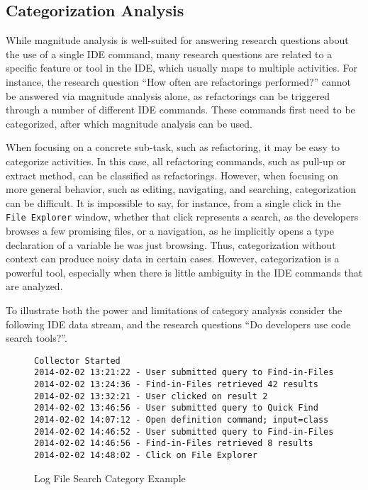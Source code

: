 \subsection{Categorization Analysis}

While magnitude analysis is well-suited for answering research questions about the use of a single IDE command, many research questions are related to a specific feature or tool in the IDE, which usually maps to multiple activities. For instance, the research question ``How often are refactorings performed?'' cannot be answered via magnitude analysis alone, as refactorings can be triggered through a number of different IDE commands. These commands first need to be categorized, after which magnitude analysis can be used. 

When focusing on a concrete sub-task, such as refactoring, it may be easy to categorize activities. In this case, all refactoring commands, such as pull-up or extract method, can be classified as refactorings. However, when focusing on more general behavior, such as editing, navigating, and searching, categorization can be difficult. It is impossible to say, for instance, from a single click in the {\tt File Explorer} window, whether that click represents a search, as the developers browses a few promising files, or a navigation, as he implicitly opens a type declaration of a variable he was just browsing. Thus, categorization without context can produce noisy data in certain cases. However, categorization is a powerful tool, especially when there is little ambiguity in the IDE commands that are analyzed.

To illustrate both the power and limitations of category analysis consider the following IDE data stream, and the research questions ``Do developers use code search tools?''. 
\begin{figure}
\hrulefill
\begin{verbatim}
Collector Started
2014-02-02 13:21:22 - User submitted query to Find-in-Files
2014-02-02 13:24:36 - Find-in-Files retrieved 42 results
2014-02-02 13:32:21 - User clicked on result 2
2014-02-02 13:46:56 - User submitted query to Quick Find
2014-02-02 14:07:12 - Open definition command; input=class
2014-02-02 14:46:52 - User submitted query to Find-in-Files
2014-02-02 14:46:56 - Find-in-Files retrieved 8 results
2014-02-02 14:48:02 - Click on File Explorer
\end{verbatim}
\hrulefill
	\caption{Log File Search Category Example}
	\label{log:logFileSearch}
\end{figure}


